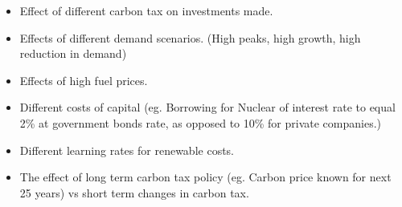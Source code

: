 \begin{itemize}
	\item Effect of different carbon tax on investments made.
	\item Effects of different demand scenarios. (High peaks, high growth, high reduction in demand)
	\item Effects of high fuel prices.
	\item Different costs of capital (eg. Borrowing for Nuclear of interest rate to equal 2\% at government bonds rate, as opposed to 10\% for private companies.)
	\item Different learning rates for renewable costs.
	\item The effect of long term carbon tax policy (eg. Carbon price known for next 25 years) vs short term changes in carbon tax.
\end{itemize}
